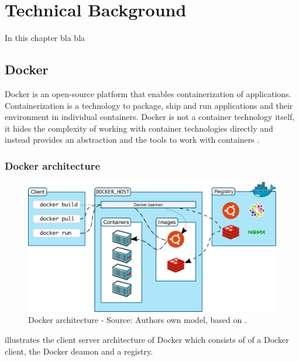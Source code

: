 \chapter{Technical Background}
\label{sec:background}
%
In this chapter bla bla


\section{Docker}
\label{sec:04_docker}
Docker is an open-source platform that enables containerization of applications. Containerization is a technology to package, ship and run applications and their environment in individual containers.
Docker is not a container technology itself, it hides the complexity of working with container technologies directly and instead provides an abstraction and the tools to work with containers \cite{Nickoloff2019Docker, Bullington2020Docker, Potdar2020Docker}.


\subsection{Docker architecture}

\begin{figure}[h]%
\centering
\includegraphics[scale=0.5]{images/04_technical_background/docker_architecture}%
\caption{Docker architecture - Source: Authors own model, based on \cite{Docker2020Docs}.}%
\label{fig:spark_docker_architecture}%
\end{figure}

 illustrates the client server architecture of Docker which consists of of a Docker client, the Docker deamon and a registry.


